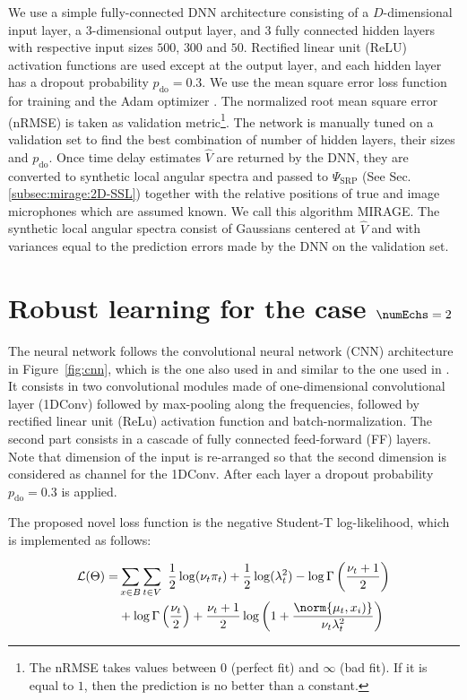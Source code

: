 We use a simple fully-connected DNN architecture consisting of a $D$-dimensional input layer,
a $3$-dimensional output layer, and 3 fully connected hidden layers with respective input
sizes $500$, $300$ and $50$. Rectified linear unit (ReLU)
activation functions are used except at the output layer,
and each hidden layer has a dropout probability $p_\text{do} = 0.3$.
We use the mean square error loss function for training and the Adam optimizer \cite{kingma2014adam}.
The normalized root mean square error (nRMSE) is taken as validation
metric\footnote{The nRMSE takes values between $0$ (perfect fit) and $\infty$ (bad fit).
If it is equal to $1$, then the prediction is no better than a constant.}.
The network is manually tuned on a validation set to find the best combination of number of hidden layers, their sizes and $p_\text{do}$.
Once time delay estimates $\hat{V}$ are returned by the DNN, they are converted to synthetic
local angular spectra and passed to $\Psi_\text{SRP}$ (See Sec. \cref{subsec:mirage:2D-SSL})
together with the relative positions of true and image microphones which are assumed known.
We call this algorithm MIRAGE. The synthetic local angular spectra consist of Gaussians
centered at $\hat{V}$ and with variances equal to the prediction errors made by
the DNN on the validation set.

\section{Robust learning for the case $\numEchs = 2$}


The neural network follows the convolutional neural network (CNN) architecture in Figure~\ref{fig:cnn}, which is the one also used in \cite{Nguyen2018} and similar to the one used in \cite{Chakrabarty2017}. It consists in two convolutional modules made of one-dimensional convolutional layer (1DConv) followed by max-pooling along the frequencies, followed by rectified linear unit (ReLu) activation function and batch-normalization.
The second part consists in a cascade of fully connected feed-forward (FF) layers.
Note that dimension of the input is re-arranged so that the second dimension is considered as channel for the 1DConv. After each layer a dropout probability $p_\text{do} = 0.3$ is applied.

The proposed novel loss function is the negative Student-T log-likelihood, which is implemented as follows:

\begin{equation}
\begin{split}
\mathcal{L}(\Theta) =& \sum_{x \in B} \sum_{t \in V}\ \dfrac{1}{2} \log (\nu_t\pi_t)
                        + \dfrac{1}{2} \log(\lambda_t^2)
                        - \log  \Gamma \left( \dfrac{\nu_t+1}{2} \right)\\
                    &    + \log  \Gamma \left( \dfrac{\nu_t}{2} \right)
                        + \dfrac{\nu_t+1}{2}
                        \log \left( 1  + \dfrac{\norm{\mu_t, x_i)}}{\nu_t \lambda_t^2} \right)\\
\end{split}
\end{equation}

